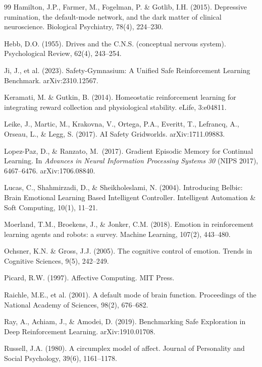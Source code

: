 \documentclass{article}
\begin{document}
\begin{thebibliography}{99}
Hamilton, J.P., Farmer, M., Fogelman, P. \& Gotlib, I.H. (2015). Depressive rumination, the default-mode network, and the dark matter of clinical neuroscience. Biological Psychiatry, 78(4), 224--230.

Hebb, D.O. (1955). Drives and the C.N.S. (conceptual nervous system). Psychological Review, 62(4), 243--254.

Ji, J., et al. (2023). Safety-Gymnasium: A Unified Safe Reinforcement Learning Benchmark. arXiv:2310.12567.

Keramati, M. \& Gutkin, B. (2014). Homeostatic reinforcement learning for integrating reward collection and physiological stability. eLife, 3:e04811.

Leike, J., Martic, M., Krakovna, V., Ortega, P.A., Everitt, T., Lefrancq, A., Orseau, L., \& Legg, S. (2017). AI Safety Gridworlds. arXiv:1711.09883.

Lopez-Paz, D., \& Ranzato, M.\ (2017). Gradient Episodic Memory for Continual Learning. In \emph{Advances in Neural Information Processing Systems 30} (NIPS 2017), 6467--6476. arXiv:1706.08840.

Lucas, C., Shahmirzadi, D., \& Sheikholeslami, N. (2004). Introducing Belbic: Brain Emotional Learning Based Intelligent Controller. Intelligent Automation \& Soft Computing, 10(1), 11--21.

Moerland, T.M., Broekens, J., \& Jonker, C.M. (2018). Emotion in reinforcement learning agents and robots: a survey. Machine Learning, 107(2), 443--480.

Ochsner, K.N. \& Gross, J.J. (2005). The cognitive control of emotion. Trends in Cognitive Sciences, 9(5), 242--249.

Picard, R.W. (1997). Affective Computing. MIT Press.

Raichle, M.E., et al. (2001). A default mode of brain function. Proceedings of the National Academy of Sciences, 98(2), 676--682.

Ray, A., Achiam, J., \& Amodei, D. (2019). Benchmarking Safe Exploration in Deep Reinforcement Learning. arXiv:1910.01708.

Russell, J.A. (1980). A circumplex model of affect. Journal of Personality and Social Psychology, 39(6), 1161--1178.


\end{thebibliography}
\end{document}
